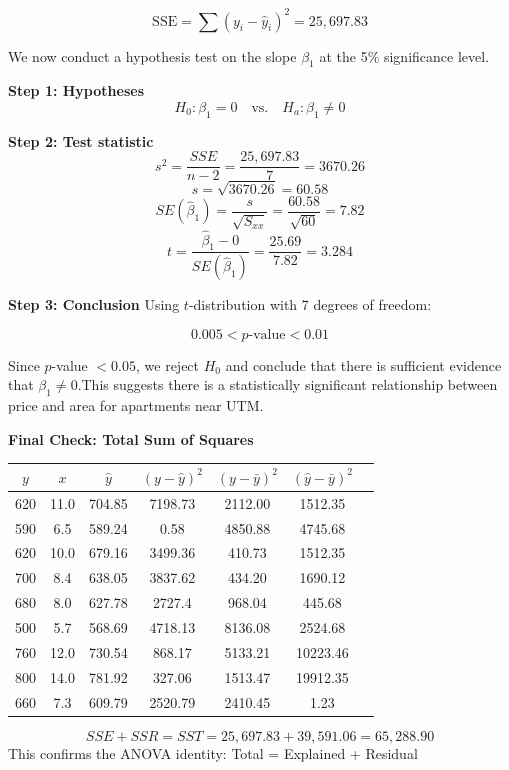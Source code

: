 \begin{example}
\[
\text{SSE} = \sum (y_i - \hat{y}_i)^2 = 25,\!697.83
\]

We now conduct a hypothesis test on the slope $\beta_1$ at the 5\% significance level.

\textbf{Step 1: Hypotheses}
\[
H_0: \beta_1 = 0 \quad \text{vs.} \quad H_a: \beta_1 \ne 0
\]

\textbf{Step 2: Test statistic}
\[
s^2 = \frac{SSE}{n - 2} = \frac{25,\!697.83}{7} = 3670.26
\]
\[
s = \sqrt{3670.26} = 60.58
\]
\[
SE(\hat{\beta}_1) = \frac{s}{\sqrt{S_{xx}}} = \frac{60.58}{\sqrt{60}} = 7.82
\]
\[
t = \frac{\hat{\beta}_1 - 0}{SE(\hat{\beta}_1)} = \frac{25.69}{7.82} = 3.284
\]

\textbf{Step 3: Conclusion}
Using $t$-distribution with 7 degrees of freedom:

\[
0.005 < p\text{-value} < 0.01
\]

Since $p$-value $< 0.05$, we reject $H_0$ and conclude that there is sufficient evidence that $\beta_1 \ne 0$.This suggests there is a statistically significant relationship between price and area for apartments near UTM.

\textbf{Final Check: Total Sum of Squares}

\begin{center}
\renewcommand{\arraystretch}{1.2}
\begin{tabular}{ccccccc}
\toprule
$y$ & $x$ & $\hat{y}$ & $(y - \hat{y})^2$ & $(y - \bar{y})^2$ & $(\hat{y} - \bar{y})^2$ \\
\midrule
620 & 11.0 & 704.85 & 7198.73 & 2112.00 & 1512.35 \\
590 & 6.5 & 589.24 & 0.58 & 4850.88 & 4745.68 \\
620 & 10.0 & 679.16 & 3499.36 & 410.73 & 1512.35 \\
700 & 8.4 & 638.05 & 3837.62 & 434.20 & 1690.12 \\
680 & 8.0 & 627.78 & 2727.4 & 968.04 & 445.68 \\
500 & 5.7 & 568.69 & 4718.13 & 8136.08 & 2524.68 \\
760 & 12.0 & 730.54 & 868.17 & 5133.21 & 10223.46 \\
800 & 14.0 & 781.92 & 327.06 & 1513.47 & 19912.35 \\
660 & 7.3 & 609.79 & 2520.79 & 2410.45 & 1.23 \\
\bottomrule
\end{tabular}
\end{center}

\[
SSE + SSR = SST = 25,\!697.83 + 39,\!591.06 = 65,\!288.90
\]
This confirms the ANOVA identity: Total = Explained + Residual


\end{example}
